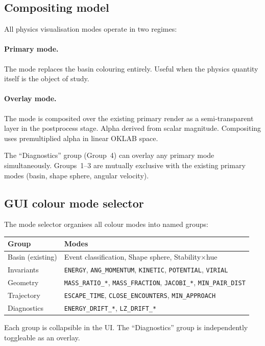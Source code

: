 \documentclass[11pt]{report}
\begin{document}
\subsection{Compositing model}

All physics visualisation modes operate in two regimes:

\paragraph{Primary mode.} The mode replaces the basin colouring entirely. Useful when the physics quantity itself is the object of study.

\paragraph{Overlay mode.} The mode is composited over the existing primary render as a semi-transparent layer in the postprocess stage. Alpha derived from scalar magnitude. Compositing uses premultiplied alpha in linear OKLAB space.

The ``Diagnostics'' group (Group~4) can overlay any primary mode simultaneously. Groups~1--3 are mutually exclusive with the existing primary modes (basin, shape sphere, angular velocity).

\subsection{GUI colour mode selector}

The mode selector organises all colour modes into named groups:
\begin{center}
\begin{tabular}{ll}
\toprule
Group & Modes \\
\midrule
Basin (existing) & Event classification, Shape sphere, Stability$\times$hue \\
Invariants & \texttt{ENERGY}, \texttt{ANG\_MOMENTUM}, \texttt{KINETIC}, \texttt{POTENTIAL}, \texttt{VIRIAL} \\
Geometry & \texttt{MASS\_RATIO\_*}, \texttt{MASS\_FRACTION}, \texttt{JACOBI\_*}, \texttt{MIN\_PAIR\_DIST} \\
Trajectory & \texttt{ESCAPE\_TIME}, \texttt{CLOSE\_ENCOUNTERS}, \texttt{MIN\_APPROACH} \\
Diagnostics & \texttt{ENERGY\_DRIFT\_*}, \texttt{LZ\_DRIFT\_*} \\
\bottomrule
\end{tabular}
\end{center}
Each group is collapsible in the UI. The ``Diagnostics'' group is independently toggleable as an overlay.
\end{document}
